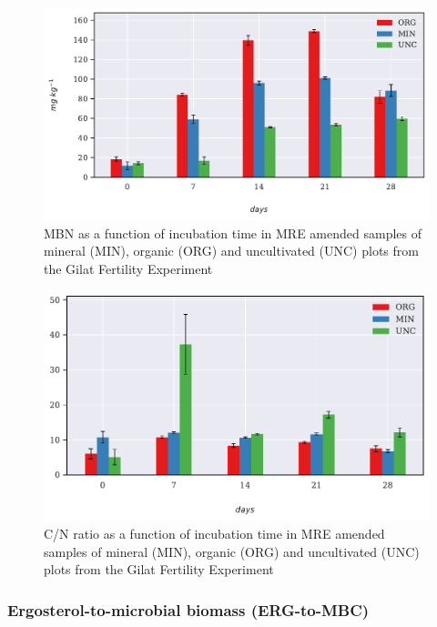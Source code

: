 			\begin{figure}[H]
				\centering
				\includegraphics[scale=0.8, width=\linewidth]{thesis_figures/main_incubation/MRE_treated/MBN.pdf}
				\caption{MBN  as a function of incubation time in MRE amended samples of mineral (MIN), organic (ORG) and uncultivated (UNC) plots from the Gilat Fertility Experiment}
				\label{fig:mbn_treated_main}
			\end{figure}

			\begin{figure}[H]
				\centering
				\includegraphics[scale=0.8, width=\linewidth]{thesis_figures/main_incubation/MRE_treated/C_N_ratio.pdf}
				\caption{C/N ratio  as a function of incubation time in MRE amended samples of mineral (MIN), organic (ORG) and uncultivated (UNC) plots from the Gilat Fertility Experiment}
				\label{fig:c_n_ratio_treated_main}
			\end{figure}





		\subsubsection{Ergosterol-to-microbial biomass (ERG-to-MBC)}

